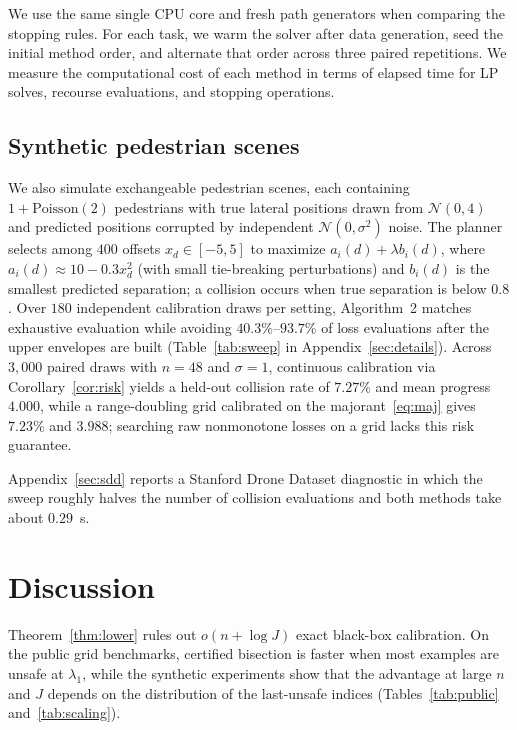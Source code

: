 \documentclass[a4paper,10pt]{article}
\theoremstyle{plain}
\theoremstyle{remark}
\begin{document}
We use the same single CPU core and fresh path generators when comparing the stopping rules. For each task, we warm the solver after data generation, seed the initial method order, and alternate that order across three paired repetitions. We measure the computational cost of each method in terms of elapsed time for LP solves, recourse evaluations, and stopping operations.

\subsection{Synthetic pedestrian scenes}\label{sec:diagnostics}

We also simulate exchangeable pedestrian scenes, each containing $1+\mathrm{Poisson}(2)$ pedestrians with true lateral positions drawn from $\mathcal N(0,4)$ and predicted positions corrupted by independent $\mathcal N(0,\sigma^2)$ noise. The planner selects among $400$ offsets $x_d\in[-5,5]$ to maximize $a_i(d)+\lambda b_i(d)$, where $a_i(d)\approx 10-0.3x_d^2$ (with small tie-breaking perturbations) and $b_i(d)$ is the smallest predicted separation; a collision occurs when true separation is below $0.8$. Over $180$ independent calibration draws per setting, Algorithm~2 matches exhaustive evaluation while avoiding $40.3\%$--$93.7\%$ of loss evaluations after the upper envelopes are built (Table~\ref{tab:sweep} in Appendix~\ref{sec:details}). Across $3{,}000$ paired draws with $n=48$ and $\sigma=1$, continuous calibration via Corollary~\ref{cor:risk} yields a held-out collision rate of $7.27\%$ and mean progress $4.000$, while a range-doubling grid calibrated on the majorant~\eqref{eq:maj} gives $7.23\%$ and $3.988$; searching raw nonmonotone losses on a grid lacks this risk guarantee.

Appendix~\ref{sec:sdd} reports a Stanford Drone Dataset diagnostic in which the sweep roughly halves the number of collision evaluations and both methods take about $0.29$~s.

\section{Discussion}\label{sec:discussion}

Theorem~\ref{thm:lower} rules out $o(n+\log J)$ exact black-box calibration. On the public grid benchmarks, certified bisection is faster when most examples are unsafe at $\lambda_1$, while the synthetic experiments show that the advantage at large $n$ and $J$ depends on the distribution of the last-unsafe indices (Tables~\ref{tab:public} and~\ref{tab:scaling}).
\end{document}
